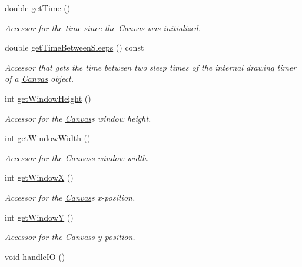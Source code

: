 \begin{DoxyCompactItemize}
double \hyperlink{classtsgl_1_1_canvas_aef462ab48e59571b9c88076bbdc8f0b3}{get\+Time} ()
\begin{DoxyCompactList}\small\item\em Accessor for the time since the \hyperlink{classtsgl_1_1_canvas}{Canvas} was initialized. \end{DoxyCompactList}\item 
double \hyperlink{classtsgl_1_1_canvas_a8786d28042b767f5c075361100227af4}{get\+Time\+Between\+Sleeps} () const 
\begin{DoxyCompactList}\small\item\em Accessor that gets the time between two sleep times of the internal drawing timer of a \hyperlink{classtsgl_1_1_canvas}{Canvas} object. \end{DoxyCompactList}\item 
int \hyperlink{classtsgl_1_1_canvas_ad740ebe5d6bd69ab79cde3e84f369f35}{get\+Window\+Height} ()
\begin{DoxyCompactList}\small\item\em Accessor for the \hyperlink{classtsgl_1_1_canvas}{Canvas}\textquotesingle{}s window height. \end{DoxyCompactList}\item 
int \hyperlink{classtsgl_1_1_canvas_a086a0322f4a6ab27da6929b1aa0593af}{get\+Window\+Width} ()
\begin{DoxyCompactList}\small\item\em Accessor for the \hyperlink{classtsgl_1_1_canvas}{Canvas}\textquotesingle{}s window width. \end{DoxyCompactList}\item 
int \hyperlink{classtsgl_1_1_canvas_a011ce2354d4565f9d2a323411a47d52d}{get\+Window\+X} ()
\begin{DoxyCompactList}\small\item\em Accessor for the \hyperlink{classtsgl_1_1_canvas}{Canvas}\textquotesingle{}s x-\/position. \end{DoxyCompactList}\item 
int \hyperlink{classtsgl_1_1_canvas_ad6e98d17d3e43d79628a3bd05221ee8b}{get\+Window\+Y} ()
\begin{DoxyCompactList}\small\item\em Accessor for the \hyperlink{classtsgl_1_1_canvas}{Canvas}\textquotesingle{}s y-\/position. \end{DoxyCompactList}\item 
void \hyperlink{classtsgl_1_1_canvas_aa499851e5e4b97bb99ca4fb3d633c17e}{handle\+I\+O} ()

\end{DoxyCompactItemize}
